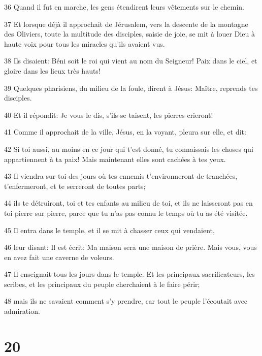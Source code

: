 \par 36 Quand il fut en marche, les gens étendirent leurs vêtements sur le chemin.
\par 37 Et lorsque déjà il approchait de Jérusalem, vers la descente de la montagne des Oliviers, toute la multitude des disciples, saisie de joie, se mit à louer Dieu à haute voix pour tous les miracles qu'ils avaient vus.
\par 38 Ils disaient: Béni soit le roi qui vient au nom du Seigneur! Paix dans le ciel, et gloire dans les lieux très hauts!
\par 39 Quelques pharisiens, du milieu de la foule, dirent à Jésus: Maître, reprends tes disciples.
\par 40 Et il répondit: Je vous le dis, s'ils se taisent, les pierres crieront!
\par 41 Comme il approchait de la ville, Jésus, en la voyant, pleura sur elle, et dit:
\par 42 Si toi aussi, au moins en ce jour qui t'est donné, tu connaissais les choses qui appartiennent à ta paix! Mais maintenant elles sont cachées à tes yeux.
\par 43 Il viendra sur toi des jours où tes ennemis t'environneront de tranchées, t'enfermeront, et te serreront de toutes parts;
\par 44 ils te détruiront, toi et tes enfants au milieu de toi, et ils ne laisseront pas en toi pierre sur pierre, parce que tu n'as pas connu le temps où tu as été visitée.
\par 45 Il entra dans le temple, et il se mit à chasser ceux qui vendaient,
\par 46 leur disant: Il est écrit: Ma maison sera une maison de prière. Mais vous, vous en avez fait une caverne de voleurs.
\par 47 Il enseignait tous les jours dans le temple. Et les principaux sacrificateurs, les scribes, et les principaux du peuple cherchaient à le faire périr;
\par 48 mais ils ne savaient comment s'y prendre, car tout le peuple l'écoutait avec admiration.

\chapter{20}


